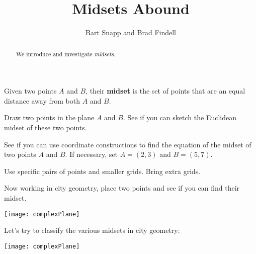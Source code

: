 \documentclass[nooutcomes]{ximera}
\title{Midsets Abound}
\author{Bart Snapp and Brad Findell}
\begin{document}
\begin{abstract}
  We introduce and investigate \textit{midsets}.
\end{abstract}
\maketitle

\begin{definition}
Given two points $A$ and $B$, their \textbf{midset} is the set of points that are an equal distance away from both $A$ and $B$.
\end{definition}

\begin{problem} 
Draw two points in the plane $A$ and $B$. See if you can sketch the
Euclidean midset of these two points.
\end{problem}

\begin{problem}
See if you can use coordinate constructions to find the equation of
the midset of two points $A$ and $B$. If necessary, set $A = (2,3)$
and $B = (5,7)$.
\end{problem}

\newpage
\begin{teachingnote}
Use specific pairs of points and smaller grids.  Bring extra grids.
\end{teachingnote}  
\begin{problem}
Now working in city geometry, place two points and see if you can find
their midset.
\begin{image}
\texttt{[image: complexPlane]}
\end{image}
\end{problem}

\newpage
\begin{problem}
Let's try to classify the various midsets in city geometry:
\begin{image}
\texttt{[image: complexPlane]}
\end{image}
\end{problem}
\end{document}
